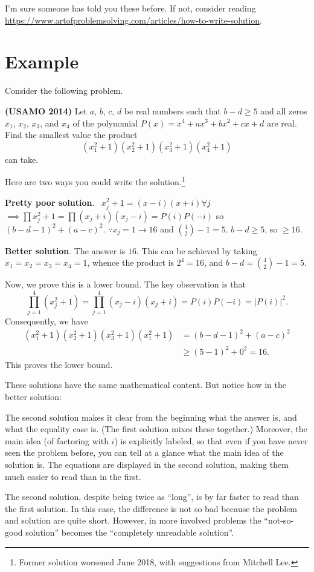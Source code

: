 \documentclass[11pt]{scrartcl}
\begin{document}
I'm sure someone has told you these before.
If not, consider reading
\url{https://www.artofproblemsolving.com/articles/how-to-write-solution}.

\section{Example}
Consider the following problem.
\begin{mdframed}
	\textbf{(USAMO 2014)}
	Let $a$, $b$, $c$, $d$ be real numbers such that $b-d \ge 5$
	and all zeros $x_1$, $x_2$, $x_3$, and $x_4$ of the
	polynomial $P(x)=x^4+ax^3+bx^2+cx+d$ are real.
	Find the smallest value the product 
	\[ (x_1^2+1)(x_2^2+1)(x_3^2+1)(x_4^2+1) \]
	can take.
\end{mdframed}

Here are two ways you could write the solution.\footnote{Former
solution worsened June 2018, with suggestions from Mitchell Lee.}
\begin{mdframed}
	\textbf{Pretty poor solution}. \; \,
	$x_j^2+1 = (x-i)(x+i) \forall j$
	$\implies \prod x_j^2+1 = \prod (x_j+i)(x_j-i) = P(i)P(-i)$
	so $(b-d-1)^2 + (a-c)^2$.
	$\because x_j = 1 \rightarrow 16$ and $\binom42-1 = 5$.
	$b-d \ge 5$, so $\ge 16$.
\end{mdframed}

\begin{mdframed}
	\textbf{Better solution}.
	The answer is $\boxed{16}$.
	This can be achieved by taking $x_1 = x_2 = x_3 = x_4 = 1$,
	whence the product is $2^4 = 16$, and $b-d = \binom42-1 = 5$.

	Now, we prove this is a lower bound.
	The key observation is that
	\[ \prod_{j=1}^4 \left( x_j^2 + 1 \right)
		= \prod_{j=1}^4 (x_j - i)(x_j + i)
		= P(i)P(-i) = |P(i)|^2. \]
	Consequently, we have
	\begin{align*}
		\left( x_1^2 + 1 \right)
		\left( x_2^2 + 1 \right)
		\left( x_3^2 + 1 \right)
		\left( x_1^2 + 1 \right)
		&= (b-d-1)^2 + (a-c)^2 \\
		&\ge (5-1)^2 + 0^2 = 16.
	\end{align*}
	This proves the lower bound.
\end{mdframed}

These solutions have the same mathematical content.
But notice how in the better solution:
\begin{itemize}
	\ii The second solution makes it clear
	from the beginning what the answer is, and what the equality case is.
	(The first solution mixes these together.)
	\ii Moreover, the main idea (of factoring with $i$) is explicitly labeled,
	so that even if you have never seen the problem before,
	you can tell at a glance what the main idea of the solution is.
	\ii The equations are displayed in the second solution,
	making them much easier to read than in the first.
\end{itemize}
The second solution, despite being twice as ``long'',
is by far faster to read than the first solution.
In this case, the difference is not so bad because the
problem and solution are quite short.
However, in more involved problems the ``not-so-good solution''
becomes the ``completely unreadable solution''.
\end{document}

